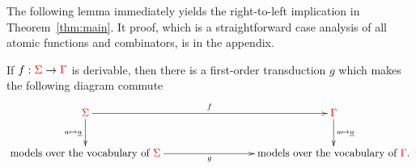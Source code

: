 The following lemma immediately yields the right-to-left implication in Theorem~\ref{thm:main}. It proof, which is a straightforward case analysis of all atomic functions and combinators, is in the appendix. 




  
\begin{proposition}\label{prop:to-logic} If $f : {\color{red}{\Sigma}} \to {\color{red}{\Gamma}}$ is derivable, then there is a first-order transduction $g$ 
    which makes the following diagram commute
    \begin{align*}
        \xymatrix@C=3cm{
            \rSigma \ar[d]_{a \mapsto \underline a}\ar[r]^f &  \rGamma \ar[d]^{a \mapsto \underline a} \\
            \text{models over the vocabulary of  $ \rSigma$} \ar[r]_g &  \text{models over the vocabulary of  $ \rGamma$}.
        } 
    \end{align*}
    
\end{proposition}



